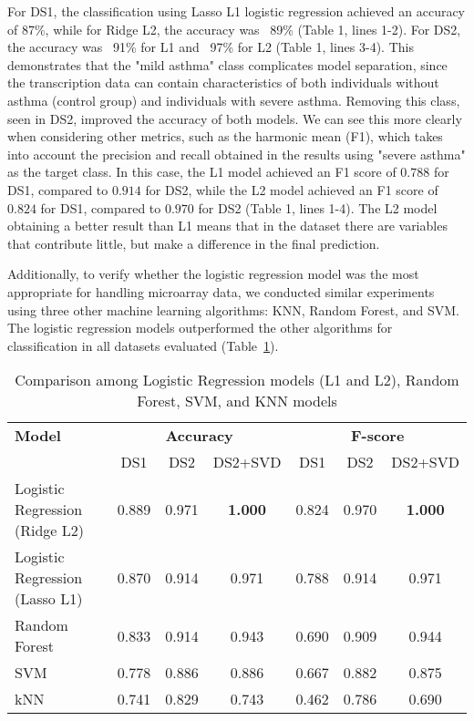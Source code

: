 For DS1, the classification using Lasso L1 logistic regression achieved an accuracy of 87\%, while for Ridge L2, the accuracy was ~89\% (Table 1, lines 1-2). For DS2, the accuracy was ~91\% for L1 and ~97\% for L2 (Table 1, lines 3-4). This demonstrates that the "mild asthma" class complicates model separation, since the transcription data can contain characteristics of both individuals without asthma (control group) and individuals with severe asthma. Removing this class, seen in DS2, improved the accuracy of both models. We can see this more clearly when considering other metrics, such as the harmonic mean (F1), which takes into account the precision and recall obtained in the results using "severe asthma" as the target class. In this case, the L1 model achieved an F1 score of $0.788$ for DS1, compared to $0.914$ for DS2, while the L2 model achieved an F1 score of $0.824$ for DS1, compared to $0.970$ for DS2 (Table 1, lines 1-4). The L2 model obtaining a better result than L1 means that in the dataset there are variables that contribute little, but make a difference in the final prediction.

Additionally, to verify whether the logistic regression model was the most appropriate for handling microarray data, we conducted similar experiments using three other machine learning algorithms: KNN, Random Forest, and SVM. The logistic regression models outperformed the other algorithms for classification in all datasets evaluated (Table~\ref{tab:log-ref-mod}).

\begin{table}[htbp] \centering
\caption{Comparison among Logistic Regression models (L1 and L2), Random Forest, SVM, and KNN models} \label{tab:log-ref-mod}
\begin{tabular}{l ccc ccc}
\hline
\textbf{Model} & \multicolumn{3}{c}{\textbf{Accuracy}} & \multicolumn{3}{c}{\textbf{F-score}} \\
               & DS1  & DS2  & DS2+SVD & DS1  & DS2  & DS2+SVD \\
\hline
Logistic Regression (Ridge L2) & 0.889 & 0.971 & \textbf{1.000} & 0.824 & 0.970 & \textbf{1.000} \\
Logistic Regression (Lasso L1) & 0.870 & 0.914 & 0.971 & 0.788 & 0.914 & 0.971 \\
Random Forest                  & 0.833 & 0.914 & 0.943 & 0.690 & 0.909 & 0.944 \\
SVM                            & 0.778 & 0.886 & 0.886 & 0.667 & 0.882 & 0.875 \\
kNN                            & 0.741 & 0.829 & 0.743 & 0.462 & 0.786 & 0.690 \\
\hline
\end{tabular}
\end{table}

